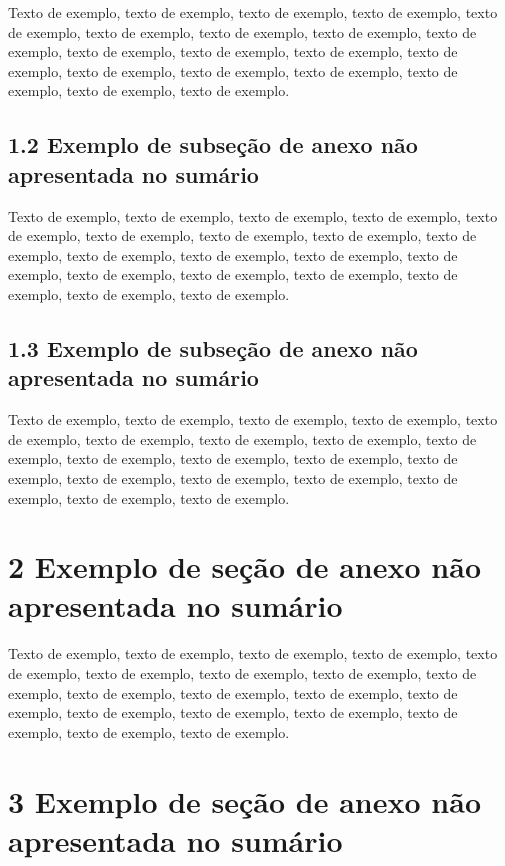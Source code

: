\documentclass[
	12pt,				%
	oneside,			%
	a4paper,			%
	english,			%
	brazil				%
	]{abntex2ppgsi}
\begin{document}
\begin{anexosenv}
Texto de exemplo, texto de exemplo, texto de exemplo, texto de exemplo, texto de exemplo, texto de exemplo, texto de exemplo, texto de exemplo, texto de exemplo, texto de exemplo, texto de exemplo, texto de exemplo, texto de exemplo, texto de exemplo, texto de exemplo, texto de exemplo, texto de exemplo, texto de exemplo, texto de exemplo.

\subsection*{1.2 Exemplo de subseção de anexo não apresentada no sumário}

Texto de exemplo, texto de exemplo, texto de exemplo, texto de exemplo, texto de exemplo, texto de exemplo, texto de exemplo, texto de exemplo, texto de exemplo, texto de exemplo, texto de exemplo, texto de exemplo, texto de exemplo, texto de exemplo, texto de exemplo, texto de exemplo, texto de exemplo, texto de exemplo, texto de exemplo.

\subsection*{1.3 Exemplo de subseção de anexo não apresentada no sumário}

Texto de exemplo, texto de exemplo, texto de exemplo, texto de exemplo, texto de exemplo, texto de exemplo, texto de exemplo, texto de exemplo, texto de exemplo, texto de exemplo, texto de exemplo, texto de exemplo, texto de exemplo, texto de exemplo, texto de exemplo, texto de exemplo, texto de exemplo, texto de exemplo, texto de exemplo.

\section*{2 Exemplo de seção de anexo não apresentada no sumário}

Texto de exemplo, texto de exemplo, texto de exemplo, texto de exemplo, texto de exemplo, texto de exemplo, texto de exemplo, texto de exemplo, texto de exemplo, texto de exemplo, texto de exemplo, texto de exemplo, texto de exemplo, texto de exemplo, texto de exemplo, texto de exemplo, texto de exemplo, texto de exemplo, texto de exemplo.

\section*{3 Exemplo de seção de anexo não apresentada no sumário}


\end{anexosenv}
\end{document}
